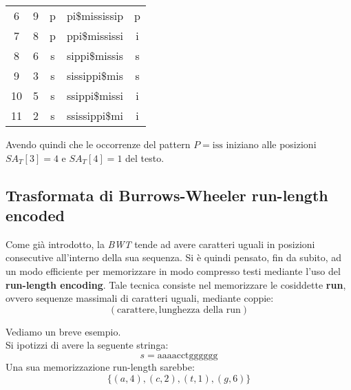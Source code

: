 \begin{esempio}
\begin{table}[H]
\begin{tabular}{c|c|c|c|c}
      6 & 9 & p & pi\$mississip & p\\
      7 & 8 & p & ppi\$mississi & i\\
      8 & 6 & s & sippi\$missis & s\\
      9 & 3 & s & sissippi\$mis & s\\
      10 & 5 & s & ssippi\$missi & i\\
      11 & 2 & s & ssissippi\$mi & i\\
    \end{tabular}
  \end{table}
  Avendo quindi che le occorrenze del pattern $P=\mbox{iss}$ iniziano alle
  posizioni $SA_T[3]=4$ e $SA_T[4]=1$ del testo.
\end{esempio}
\subsection{Trasformata di Burrows-Wheeler run-length encoded}
Come già introdotto, la \textit{BWT} tende ad avere caratteri uguali in
posizioni consecutive all'interno della sua sequenza. Si è quindi 
pensato, fin da subito, ad un modo efficiente per memorizzare in modo compresso
testi mediante l'uso del \textbf{run-length encoding}. Tale tecnica consiste nel
memorizzare le cosiddette \textbf{run}, ovvero sequenze massimali di caratteri
uguali, mediante coppie: 
\[(\mbox{carattere}, \mbox{lunghezza della run})\]
\begin{esempio}
  Vediamo un breve esempio.\\
  Si ipotizzi di avere la seguente stringa:
  \[s=\mbox{aaaacctgggggg}\]
  Una sua memorizzazione run-length sarebbe:
  \[\{(a,4),(c,2),(t,1),(g,6)\}\]
\end{esempio}
